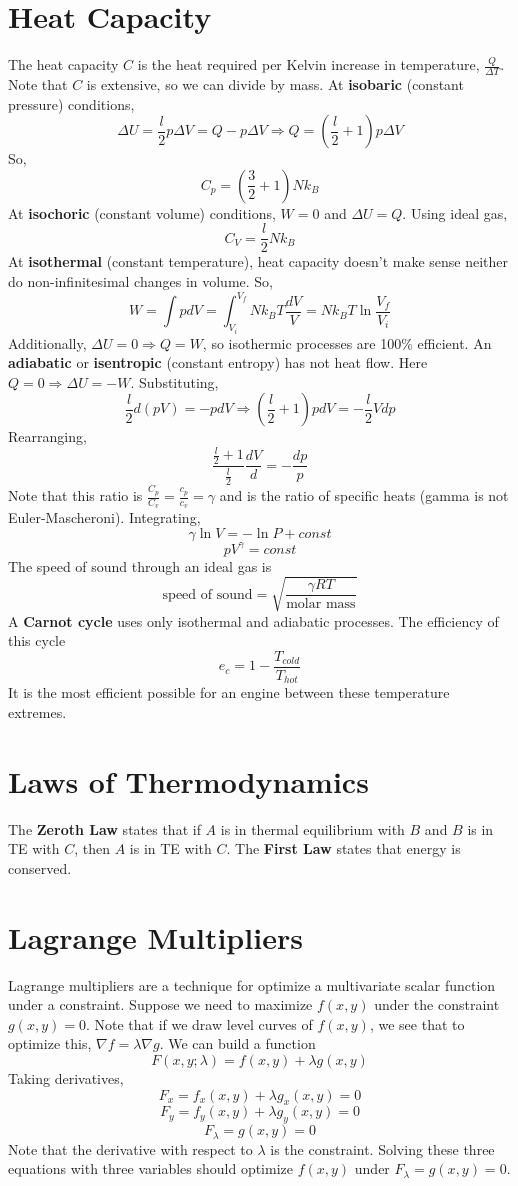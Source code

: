\documentclass[../main.tex]{subfiles}
\begin{document}
\section{Heat Capacity}
The heat capacity $C$ is the heat required per Kelvin increase in temperature, $\frac{Q}{\Delta T}$. Note that $C$ 
is extensive, so we can divide by mass. At \textbf{isobaric} (constant pressure) conditions,
$$\Delta U=\frac{l}{2}p\Delta V=Q-p\Delta V\Rightarrow Q=\left(\frac{l}{2}+1\right)p\Delta V$$
So,
$$C_{p}=\left(\frac{3}{2}+1\right)Nk_{B}$$
At \textbf{isochoric} (constant volume) conditions, $W=0$ and $\Delta U=Q$. Using ideal gas,
$$C_{V}=\frac{l}{2}Nk_{B}$$
At \textbf{isothermal} (constant temperature), heat capacity doesn't make sense neither do non-infinitesimal
changes in volume. So, 
$$W=\int pdV=\int_{V_{i}}^{V_{f}}Nk_{B}T\frac{dV}{V}=Nk_{B}T\ln\frac{V_{f}}{V_{i}}$$
Additionally, $\Delta U=0\Rightarrow Q=W$, so isothermic processes are 100\% efficient.
An \textbf{adiabatic} or \textbf{isentropic} (constant entropy) has not heat flow. Here $Q=0\Rightarrow \Delta U=-W$.
Substituting,
$$\frac{l}{2}d(pV)=-pdV\Rightarrow \left(\frac{l}{2}+1\right)pdV=-\frac{l}{2}Vdp$$
Rearranging,
$$\frac{\frac{l}{2}+1}{\frac{l}{2}}\frac{dV}{d}=-\frac{dp}{p}$$
Note that this ratio is $\frac{C_{p}}{C_{v}}=\frac{c_{p}}{c_{v}}=\gamma$ and is the ratio of specific heats
(gamma is not Euler-Mascheroni).
Integrating,
$$\gamma \ln V = -\ln P+const$$
$$pV^{\gamma}=const$$
The speed of sound through an ideal gas is 
$$\text{speed of sound}=\sqrt{\frac{\gamma RT}{\text{molar mass}}}$$
A \textbf{Carnot cycle} uses only isothermal and adiabatic processes. The efficiency of this cycle
$$e_{c}=1-\frac{T_{cold}}{T_{hot}}$$
It is the most efficient possible for an engine between these temperature extremes.

\section{Laws of Thermodynamics}
The \textbf{Zeroth Law} states that if $A$ is in thermal equilibrium with $B$ and $B$ is in TE with $C$,
then $A$ is in TE with $C$. The \textbf{First Law} states that energy is conserved.

\section{Lagrange Multipliers}
Lagrange multipliers are a technique for optimize a multivariate scalar function under a constraint.
Suppose we need to maximize $f(x,y)$ under the constraint $g(x,y)=0$. Note that if we draw level curves
of $f(x,y)$, we see that to optimize this, $\nabla f = \lambda \nabla g$. We can build a function
$$F(x,y;\lambda)=f(x,y)+\lambda g(x,y)$$
Taking derivatives,
$$F_{x}=f_{x}(x,y)+\lambda g_{x}(x,y)=0$$
$$F_{y}=f_{y}(x,y)+\lambda g_{y}(x,y)=0$$
$$F_{\lambda}=g(x,y)=0$$
Note that the derivative with respect to $\lambda$ is the constraint. Solving these three equations with 
three variables should optimize $f(x,y)$ under $F_{\lambda}=g(x,y)=0$. 
\end{document}
